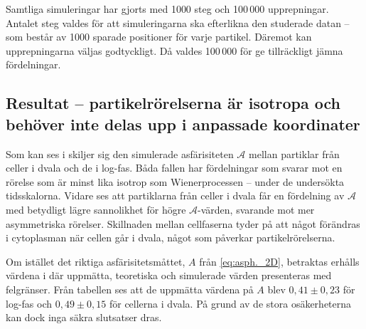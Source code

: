 Samtliga simuleringar har gjorts med 1000 steg och 100\,000 upprepningar. Antalet steg valdes för att simuleringarna ska efterlikna den studerade datan -- som består av 1000 sparade positioner för varje partikel. Däremot kan upprepningarna väljas godtyckligt. Då valdes 100\,000 för ge tillräckligt jämna fördelningar.



\subsection{Resultat -- partikelrörelserna är isotropa och behöver inte delas upp i anpassade koordinater}
\label{sec:resultat-isotropi}



Som kan ses i  skiljer sig den simulerade asfärisiteten $\mathcal{A}$ mellan partiklar från celler i dvala och de i log-fas. Båda fallen har fördelningar som svarar mot en rörelse som är minst lika isotrop som Wienerprocessen -- under de undersökta tidsskalorna. Vidare ses att partiklarna från celler i dvala får en fördelning av $\mathcal{A}$ med betydligt lägre sannolikhet för högre $\mathcal{A}$-värden, svarande mot mer asymmetriska rörelser. Skillnaden mellan cellfaserna tyder på att något förändras i cytoplasman när cellen går i dvala, något som påverkar partikelrörelserna. 

Om istället det riktiga asfärisitetsmåttet, $A$ från \eqref{eq:asph._2D}, betraktas erhålls värdena i  där uppmätta, teoretiska och simulerade värden presenteras med felgränser. %
Från tabellen ses att de uppmätta värdena på $A$ blev $0,41\pm0,23$ för log-fas och $0,49\pm0,15$ för cellerna i dvala. På grund av de stora osäkerheterna kan dock inga säkra slutsatser dras.



